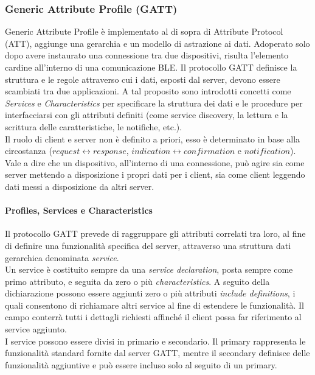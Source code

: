 \subsubsection{Generic Attribute Profile (GATT)}
Generic Attribute Profile è implementato al di sopra di Attribute Protocol (ATT), aggiunge una gerarchia e un modello di astrazione ai dati. Adoperato solo dopo avere instaurato una connessione tra due dispositivi, risulta l'elemento cardine all'interno di una comunicazione BLE. Il protocollo GATT definisce la struttura e le regole attraverso cui i dati, esposti dal server, devono essere scambiati tra due applicazioni. A tal proposito sono introdotti concetti come \textit{Services} e \textit{Characteristics} per specificare la struttura dei dati e le procedure per interfacciarsi con gli attributi definiti (come service discovery, la lettura e  la scrittura delle caratteristiche, le notifiche, etc.).\\
Il ruolo di client e server non è definito a priori, esso è determinato in base alla circostanza ($request \leftrightarrow{response}$, $indication \leftrightarrow{confirmation}$ e $notification$). Vale a dire che un dispositivo, all'interno di una connessione, può agire sia come server mettendo a disposizione i propri dati per i client, sia come client leggendo dati messi a disposizione da altri server.

\paragraph{Profiles, Services e Characteristics}
Il protocollo GATT prevede di raggruppare gli attributi correlati tra loro, al fine di definire una funzionalità specifica del server, attraverso una struttura dati gerarchica denominata \textit{service}.\\

\noindent Un service è costituito sempre da una \textit{service declaration}, posta sempre come primo attributo, e seguita da zero o più \textit{characteristics}. A seguito della dichiarazione possono essere aggiunti zero o più attributi \textit{include definitions}, i quali consentono di richiamare altri service al fine di estendere le funzionalità. Il campo conterrà tutti i dettagli richiesti affinché il client possa far riferimento al service aggiunto.\\
I service possono essere divisi in primario e secondario. Il primary rappresenta le funzionalità standard fornite dal server GATT, mentre il secondary definisce delle funzionalità aggiuntive e può essere incluso solo al seguito di un primary.

